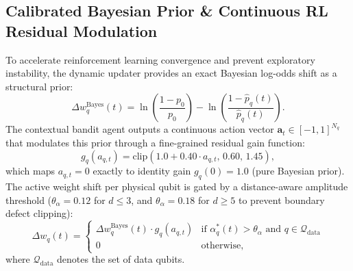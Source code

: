 \documentclass[aps,prxquantum,reprint,superscriptaddress,floatfix,nofootinbib]{revtex4-2}
\begin{document}
\subsection{Calibrated Bayesian Prior \& Continuous RL Residual Modulation}
\label{subsec:bayesian_rl}
To accelerate reinforcement learning convergence and prevent exploratory instability, the dynamic updater provides an exact Bayesian log-odds shift as a structural prior:
\begin{equation}
    \Delta w_q^{\text{Bayes}}(t) = \ln\left( \frac{1 - p_0}{p_0} \right) - \ln\left( \frac{1 - \hat{p}_q(t)}{\hat{p}_q(t)} \right).
    \label{eq:bayes_shift}
\end{equation}
The contextual bandit agent outputs a continuous action vector $\mathbf{a}_t \in [-1, 1]^{N_q}$ that modulates this prior through a fine-grained residual gain function:
\begin{equation}
    g_q(a_{q, t}) = \text{clip}\left( 1.0 + 0.40 \cdot a_{q, t}, \, 0.60, \, 1.45 \right),
    \label{eq:residual_gain}
\end{equation}
which maps $a_{q, t} = 0$ exactly to identity gain $g_q(0) = 1.0$ (pure Bayesian prior). The active weight shift per physical qubit is gated by a distance-aware amplitude threshold ($\theta_\alpha = 0.12$ for $d \le 3$, and $\theta_\alpha = 0.18$ for $d \ge 5$ to prevent boundary defect clipping):
\begin{equation}
    \Delta w_q(t) = \begin{cases}
        \Delta w_q^{\text{Bayes}}(t) \cdot g_q(a_{q, t}) & \text{if } \alpha_q^*(t) > \theta_\alpha \text{ and } q \in \mathcal{Q}_{\text{data}} \\
        0 & \text{otherwise,}
    \end{cases}
    \label{eq:delta_w_gate}
\end{equation}
where $\mathcal{Q}_{\text{data}}$ denotes the set of data qubits.
\end{document}
